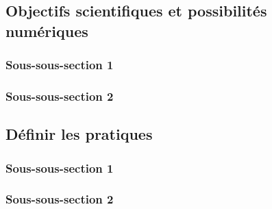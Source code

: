 
\subsection{Objectifs scientifiques et possibilités numériques}
    \subsubsection{Sous-sous-section 1}

    
    \subsubsection{Sous-sous-section 2}

    
    \subsection{Définir les pratiques}
        \subsubsection{Sous-sous-section 1}


        \subsubsection{Sous-sous-section 2}

